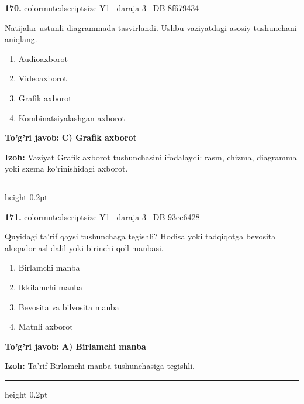 \documentclass[10pt,a4paper,oneside]{article}
\begin{document}
\noindent\textbf{\color{ink}170.}  {color{muted}scriptsize Y1 \textbullet\ daraja 3 \textbullet\ DB 8f679434}
\par
Natijalar ustunli diagrammada tasvirlandi. Ushbu vaziyatdagi asosiy tushunchani aniqlang.
\begin{enumerate}[label=\Alph*),leftmargin=9mm]
\item Audioaxborot
\item Videoaxborot
\item Grafik axborot
\item Kombinatsiyalashgan axborot
\end{enumerate}
\begin{tcolorbox}[enhanced,breakable,colback=teal!4,colframe=teal!50!black,boxrule=0.5pt,arc=1.1mm,left=3mm,right=3mm,top=1.7mm,bottom=1.7mm,before skip=2mm,after skip=2mm]
\textbf{\color{teal}To'g'ri javob:} \textbf{C) Grafik axborot}
\par\smallskip
\textbf{Izoh:} Vaziyat Grafik axborot tushunchasini ifodalaydi: rasm, chizma, diagramma yoki sxema ko'rinishidagi axborot.
\end{tcolorbox}
\vspace{2mm}\hrule height 0.2pt \vspace{3mm}

\noindent\textbf{\color{ink}171.}  {color{muted}scriptsize Y1 \textbullet\ daraja 3 \textbullet\ DB 93ec6428}
\par
Quyidagi ta'rif qaysi tushunchaga tegishli? Hodisa yoki tadqiqotga bevosita aloqador asl dalil yoki birinchi qo'l manbasi.
\begin{enumerate}[label=\Alph*),leftmargin=9mm]
\item Birlamchi manba
\item Ikkilamchi manba
\item Bevosita va bilvosita manba
\item Matnli axborot
\end{enumerate}
\begin{tcolorbox}[enhanced,breakable,colback=teal!4,colframe=teal!50!black,boxrule=0.5pt,arc=1.1mm,left=3mm,right=3mm,top=1.7mm,bottom=1.7mm,before skip=2mm,after skip=2mm]
\textbf{\color{teal}To'g'ri javob:} \textbf{A) Birlamchi manba}
\par\smallskip
\textbf{Izoh:} Ta'rif Birlamchi manba tushunchasiga tegishli.
\end{tcolorbox}
\vspace{2mm}\hrule height 0.2pt \vspace{3mm}
\end{document}
